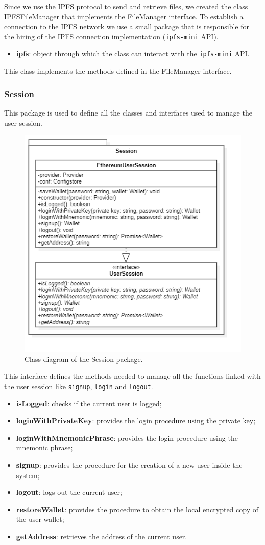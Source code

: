 				Since we use the IPFS protocol to send and retrieve files, we created the class IPFSFileManager that implements the FileManager interface. To establish a connection to the IPFS network we use a small package that is responsible for the hiring of the IPFS connection implementation (\texttt{ipfs-mini} API). 
				
				\begin{itemize}
					\item \textbf{ipfs}: object through which the class can interact with the \texttt{ipfs-mini} API.
				\end{itemize}
				
				This class implements the methods defined in the FileManager interface. 
	
		\subsubsection{Session} 
		This package is used to define all the classes and interfaces used to manage the user session.
		\begin{figure} [h!]
			\centering
			\includegraphics[width=0.5\linewidth]{diagrammi/etherless-cli/Session}
			\caption{Class diagram of the Session package.}
		\end{figure}
			
			This interface defines the methods needed to manage all the functions linked with the user session like \texttt{signup}, \texttt{login} and \texttt{logout}.
				\begin{itemize}
					\item \textbf{isLogged}: checks if the current user is logged;
					\item \textbf{loginWithPrivateKey}: provides the login procedure using the private key;
					\item \textbf{loginWithMnemonicPhrase}: provides the login procedure using the mnemonic phrase;
					\item \textbf{signup}: provides the procedure for the creation of a new user inside the system;
					\item \textbf{logout}: logs out the current user;
					\item \textbf{restoreWallet}: provides the procedure to obtain the local encrypted copy of the user wallet;
					\item \textbf{getAddress}: retrieves the address of the current user.
				\end{itemize}
			
